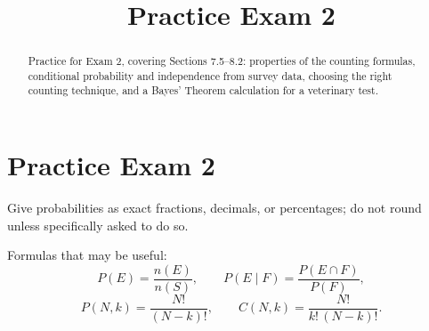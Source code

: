\documentclass[12pt]{ximera}
\title{Practice Exam 2}
\begin{document}
\begin{abstract}
Practice for Exam 2, covering Sections 7.5--8.2: properties of the counting formulas, conditional
probability and independence from survey data, choosing the right counting technique,
and a Bayes' Theorem calculation for a veterinary test.
\end{abstract}
\maketitle

\section*{Practice Exam 2}

Give probabilities as exact fractions, decimals, or percentages; do not round unless
specifically asked to do so.

Formulas that may be useful:
\[
P(E)=\frac{n(E)}{n(S)}, \qquad P(E\mid F)=\frac{P(E\cap F)}{P(F)},
\]
\[
P(N,k)=\frac{N!}{(N-k)!}, \qquad C(N,k)=\frac{N!}{k!\,(N-k)!}.
\]
\end{document}
